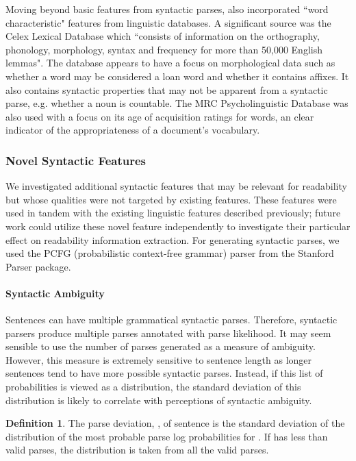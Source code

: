 \documentclass[11pt,a4paper]{article}
\theoremstyle{definition}
\newtheorem{definition}{Definition}[section]
\begin{document}
 Moving beyond basic features from syntactic parses, \citet{vajjalabalakrishnaAnalyzingTextComplexity2015} also incorporated ``word characteristic" features from linguistic databases. A significant source was the Celex Lexical Database \citet{Baayen1995TheCL} which ``consists of information on the orthography, phonology, morphology, syntax and
frequency for more than 50,000 English lemmas". The database appears to have a focus on morphological data such as whether a word may be considered a loan word and whether it contains affixes. It also contains syntactic properties that may not be apparent from a syntactic parse, e.g. whether a noun is countable. The MRC Psycholinguistic Database \citet{wilsonMRCPsycholinguisticDatabase1988} was also used with a focus on its age of acquisition ratings for words, an clear indicator of the appropriateness of a document's vocabulary.


\subsubsection{Novel Syntactic Features}

We investigated additional syntactic features that may be relevant for readability but whose qualities were not targeted by existing features. These features were used in tandem with the existing linguistic features described previously; future work could utilize these novel feature independently to investigate their particular effect on readability information extraction.  For generating syntactic parses, we used the PCFG (probabilistic context-free grammar) parser \citep{kleinAccurateUnlexicalizedParsing2003} from the Stanford Parser package.

\paragraph{Syntactic Ambiguity}

Sentences can have multiple grammatical syntactic parses. Therefore, syntactic parsers produce multiple parses annotated with parse likelihood. It may seem sensible to use the number of parses generated as a measure of ambiguity. However, this measure is extremely sensitive to sentence length as longer sentences tend to have more possible syntactic parses. Instead, if this list of probabilities is viewed as a distribution, the standard deviation of this distribution is likely to correlate with perceptions of syntactic ambiguity. 

\theoremstyle{definition}
\begin{definition}{}

The parse deviation, , of sentence  is the standard deviation of the distribution of the  most probable parse log probabilities for . If  has less than  valid parses, the distribution is taken from all the valid parses.
\end{definition}
\end{document}
